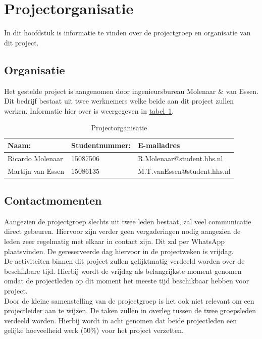 \documentclass[numbers=endperiod]{scrartcl}
\newcommand{\sectionSmall}[1]{
	\vspace{-10pt}
	\section{#1}
	\vspace{-5pt}
}
\newcommand{\whitespace}{\vspace*{2 mm} \\}%
\newcommand{\tableref}[1]{\hyperref[table:#1]{tabel~\ref{table:#1}}}
\begin{document}
	\sectionSmall{Projectorganisatie}
	In dit hoofdstuk is informatie te vinden over de projectgroep en organisatie van dit project.
	\subsection{Organisatie}
	Het gestelde project is aangenomen door ingenieursbureau Molenaar \& van Essen. Dit bedrijf bestaat uit
	twee werknemers welke beide aan dit project zullen werken. Informatie hier over is weergegeven in \tableref{Projectorganisatie}. 
	\begin{table}[h]
		\caption{Projectorganisatie}\label{table:Projectorganisatie}
		
		\centering
		\begin{tabular}{ p{} | p{} | p{} }
			Naam: 				& Studentnummer:& E-mailadres \\ \hline
			Ricardo Molenaar 	& 15087506	 	& R.Molenaar@student.hhs.nl \\
			Martijn van Essen 	& 15086135		& M.T.vanEssen@student.hhs.nl \\
		\end{tabular}
		
	\end{table}
	\subsection{Contactmomenten}
	Aangezien de projectgroep slechts uit twee leden bestaat, zal veel communicatie direct gebeuren. Hiervoor zijn verder geen vergaderingen nodig aangezien de leden zeer regelmatig met elkaar in contact zijn. Dit zal per WhatsApp plaatsvinden. De gereserveerde dag hiervoor in de projectweken is vrijdag. 
	\whitespace
	De activiteiten binnen dit project zullen gelijktmatig verdeeld worden over de beschikbare tijd. Hierbij wordt de vrijdag als belangrijkste moment genomen omdat de projectleden op dit moment het meeste tijd beschikbaar hebben voor project.
	\whitespace
	Door de kleine samenstelling van de projectgroep is het ook niet relevant om een projectleider aan te wijzen. De taken zullen in overleg tussen de twee groepsleden verdeeld worden. Hierbij wordt in acht genomen dat beide projectleden een gelijke hoeveelheid werk (50\%) voor het project verzetten.
	
\end{document}
